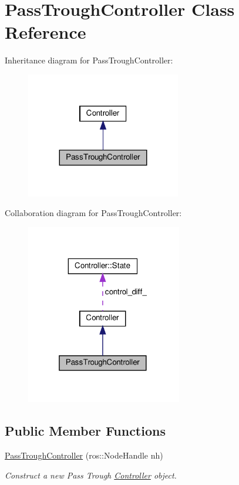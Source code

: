 \hypertarget{classPassTroughController}{}\section{Pass\+Trough\+Controller Class Reference}
\label{classPassTroughController}


Inheritance diagram for Pass\+Trough\+Controller\+:\nopagebreak
\begin{figure}[H]
\begin{center}
\leavevmode
\includegraphics[width=191pt]{dc/de8/classPassTroughController__inherit__graph}
\end{center}
\end{figure}


Collaboration diagram for Pass\+Trough\+Controller\+:\nopagebreak
\begin{figure}[H]
\begin{center}
\leavevmode
\includegraphics[width=193pt]{d5/d84/classPassTroughController__coll__graph}
\end{center}
\end{figure}
\subsection*{Public Member Functions}
\begin{DoxyCompactItemize}
\item 
\hyperlink{classPassTroughController_ab07ab9e0032dd1a46f3fd80726ce4b1f}{Pass\+Trough\+Controller} (ros\+::\+Node\+Handle nh)
\begin{DoxyCompactList}\small\item\em Construct a new Pass Trough \hyperlink{classController}{Controller} object. \end{DoxyCompactList}\end{DoxyCompactItemize}
